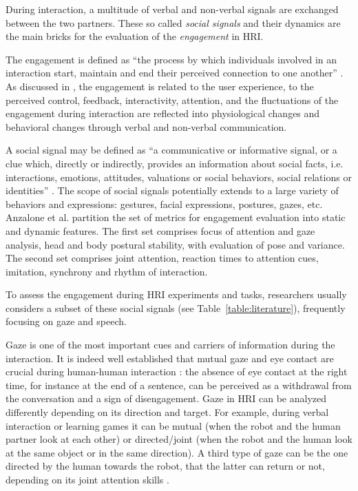 \documentclass[twocolumn]{svjour3}          %
\begin{document}
During interaction, a multitude of verbal and non-verbal signals are exchanged between the two partners. These so called \textit{social signals}  and their dynamics are the main bricks for the evaluation of the \textit{engagement} in HRI.

The engagement is defined as ``the process by which individuals involved in an interaction start, maintain and end their perceived connection to one another'' \cite{sidner2005}. As discussed in \cite{Anzalone2015engagement}, the engagement is related to the user experience, to the perceived control, feedback, interactivity, attention, and the fluctuations of the engagement during interaction are reflected into physiological changes and behavioral changes through verbal and non-verbal communication.

A social signal may be defined as ``a communicative or informative signal, or a clue which, directly or indirectly, provides an information about social facts, i.e. interactions, emotions, attitudes, valuations or social behaviors, social relations or identities'' \cite{Poggi2012}. The scope of social signals potentially extends to a large variety of behaviors and expressions: gestures, facial expressions, postures, gazes, etc. 
Anzalone et al. \cite{Anzalone2015engagement} partition the set of metrics for engagement evaluation into static and dynamic features. The first set comprises focus of attention and gaze analysis, head and body postural stability, with evaluation of pose and variance. The second set comprises joint attention, reaction times to attention cues, imitation, synchrony and rhythm of interaction. 

To assess the engagement during HRI experiments and tasks, researchers usually considers a subset of these social signals (see Table~\ref{table:literature}), frequently focusing on gaze and speech.


Gaze is one of the most important cues and carriers of information during the interaction.
It is indeed well established that mutual gaze and eye contact are crucial during human-human interaction \cite{Goffman1967}: the absence of eye contact at the right time, for instance at the end of a sentence, can be perceived as a withdrawal from the conversation and a sign of disengagement. 
Gaze in HRI can be analyzed differently depending on its direction and target.
For example, during verbal interaction \cite{rich2010recognizing,Iishi2011} or learning games \cite{ivaldi2014frontiers} it can be mutual (when the robot and the human partner look at each other) or directed/joint (when the robot and the human look at the same object or in the same direction).  
A third type of gaze can be the one directed by the human towards the robot, that the latter can return or not, depending on its joint attention skills \cite{sidner2004}.
 
\end{document}
